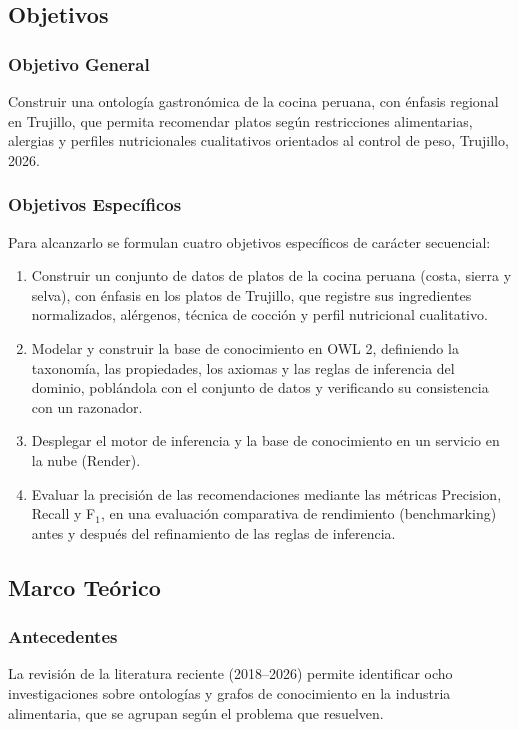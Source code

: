 \documentclass[conference]{IEEEtran}
\begin{document}
\subsection{Objetivos}

\subsubsection{Objetivo General}
Construir una ontología gastronómica de la cocina peruana, con énfasis regional en Trujillo, que permita recomendar platos según restricciones alimentarias, alergias y perfiles nutricionales cualitativos orientados al control de peso, Trujillo, 2026.

\subsubsection{Objetivos Específicos}
Para alcanzarlo se formulan cuatro objetivos específicos de carácter secuencial:
\begin{enumerate}
\item Construir un conjunto de datos de platos de la cocina peruana (costa, sierra y selva), con énfasis en los platos de Trujillo, que registre sus ingredientes normalizados, alérgenos, técnica de cocción y perfil nutricional cualitativo.
\item Modelar y construir la base de conocimiento en OWL 2, definiendo la taxonomía, las propiedades, los axiomas y las reglas de inferencia del dominio, poblándola con el conjunto de datos y verificando su consistencia con un razonador.
\item Desplegar el motor de inferencia y la base de conocimiento en un servicio en la nube (Render).
\item Evaluar la precisión de las recomendaciones mediante las métricas Precision, Recall y F$_1$, en una evaluación comparativa de rendimiento (benchmarking) antes y después del refinamiento de las reglas de inferencia.
\end{enumerate}

\subsection{Marco Teórico}

\subsubsection{Antecedentes}
La revisión de la literatura reciente (2018--2026) permite identificar ocho investigaciones sobre ontologías y grafos de conocimiento en la industria alimentaria, que se agrupan según el problema que resuelven.
\end{document}
